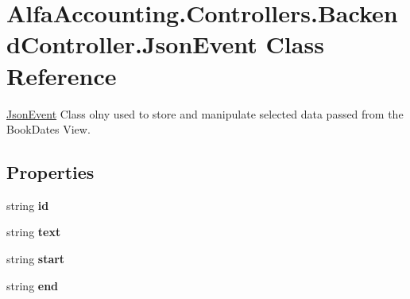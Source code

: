 \hypertarget{class_alfa_accounting_1_1_controllers_1_1_backend_controller_1_1_json_event}{}\section{Alfa\+Accounting.\+Controllers.\+Backend\+Controller.\+Json\+Event Class Reference}
\label{class_alfa_accounting_1_1_controllers_1_1_backend_controller_1_1_json_event}


\hyperlink{class_alfa_accounting_1_1_controllers_1_1_backend_controller_1_1_json_event}{Json\+Event} Class olny used to store and manipulate selected data passed from the Book\+Dates View.  


\subsection*{Properties}
\begin{DoxyCompactItemize}
\item 
\mbox{\label{class_alfa_accounting_1_1_controllers_1_1_backend_controller_1_1_json_event_a8c9465ddc8548c30788078d844a23dd7}} 
string {\bfseries id}
\item 
\mbox{\label{class_alfa_accounting_1_1_controllers_1_1_backend_controller_1_1_json_event_a329641df9ef9f81daf1d1d7ab6e49a93}} 
string {\bfseries text}
\item 
\mbox{\label{class_alfa_accounting_1_1_controllers_1_1_backend_controller_1_1_json_event_aa1aef33132fe927feed41bbaca656e21}} 
string {\bfseries start}
\item 
\mbox{\label{class_alfa_accounting_1_1_controllers_1_1_backend_controller_1_1_json_event_a7cb3400164e55ae0977d388d7013ed81}} 
string {\bfseries end}
\end{DoxyCompactItemize}



